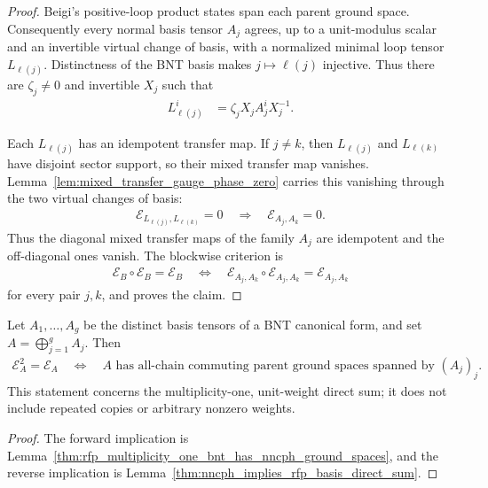 \begin{proof}
    \leanok
    Beigi's positive-loop product states span each parent ground space.
    Consequently every normal basis tensor $A_j$ agrees, up to a unit-modulus
    scalar and an invertible virtual change of basis, with a normalized
    minimal loop tensor $L_{\ell(j)}$. Distinctness of the BNT basis makes
    $j\mapsto\ell(j)$ injective. Thus there are $\zeta_j\ne 0$ and invertible
    $X_j$ such that
    \begin{align}
        L_{\ell(j)}^i & = \zeta_j X_j A_j^i X_j^{-1}.
    \end{align}

    Each $L_{\ell(j)}$ has an idempotent transfer map. If $j\ne k$, then
    $L_{\ell(j)}$ and $L_{\ell(k)}$ have disjoint sector support, so their
    mixed transfer map vanishes. Lemma~\ref{lem:mixed_transfer_gauge_phase_zero}
    carries this vanishing through the two virtual changes of basis:
    \begin{align}
        \mathcal E_{L_{\ell(j)},L_{\ell(k)}}=0
        \quad\Longrightarrow\quad
        \mathcal E_{A_j,A_k}=0.
    \end{align}
    Thus the diagonal mixed transfer maps of the family $A_j$ are idempotent
    and the off-diagonal ones vanish. The blockwise criterion is
    \begin{align}
        \mathcal E_B\circ\mathcal E_B=\mathcal E_B
        \quad\Longleftrightarrow\quad
        \mathcal E_{A_j,A_k}\circ\mathcal E_{A_j,A_k}
        =\mathcal E_{A_j,A_k}
    \end{align}
    for every pair $j,k$, and proves the claim.
\end{proof}

\begin{theorem}
    \label{thm:rfp_multiplicity_one_bnt_iff_nncph_ground_spaces}
    \leanok
    Let $A_1,\ldots,A_g$ be the distinct basis tensors of a BNT canonical
    form, and set $A=\bigoplus_{j=1}^g A_j$. Then
    \begin{align}
        \mathcal E_A^2=\mathcal E_A
        \quad\Longleftrightarrow\quad
        A\text{ has all-chain commuting parent ground spaces spanned by }(A_j)_j.
    \end{align}
    This statement concerns the multiplicity-one, unit-weight direct sum; it
    does not include repeated copies or arbitrary nonzero weights.
\end{theorem}

\begin{proof}
    \leanok
    The forward implication is
    Lemma~\ref{thm:rfp_multiplicity_one_bnt_has_nncph_ground_spaces}, and the
    reverse implication is
    Lemma~\ref{thm:nncph_implies_rfp_basis_direct_sum}.
\end{proof}
